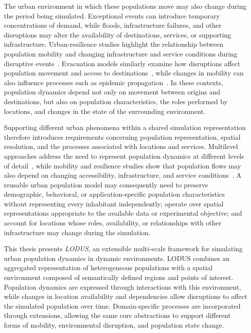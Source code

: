 The urban environment in which these populations move may also change during the period being simulated. Exceptional events can introduce temporary concentrations of demand, while floods, infrastructure failures, and other disruptions may alter the availability of destinations, services, or supporting infrastructure. 
Urban-resilience studies highlight the relationship between population mobility and changing infrastructure and service conditions during disruptive events~\cite{haraguchi2022mobilityDataReview,ye2023digitalTwinResiliance}. Evacuation models similarly examine how disruptions affect population movement and access to destinations~\cite{hassannayebi2020hybridEvacuation}, while changes in mobility can also influence processes such as epidemic propagation~\cite{natureKramer2020mobilityCovid,hernandez2021human}. In these contexts, population dynamics depend not only on movement between origins and destinations, but also on population characteristics, the roles performed by locations, and changes in the state of the surrounding environment.

Supporting different urban phenomena within a shared simulation representation therefore introduces requirements concerning population representation, spatial resolution, and the processes associated with locations and services. Multilevel approaches address the need to represent population dynamics at different levels of detail~\cite{serana2023multilevelmodeling}, while mobility and resilience studies show that population flows may also depend on changing accessibility, infrastructure, and service conditions~\cite{haraguchi2022mobilityDataReview,ye2023digitalTwinResiliance}. 
A reusable urban population model may consequently need to preserve demographic, behavioral, or application-specific population characteristics without representing every inhabitant independently; operate over spatial representations appropriate to the available data or experimental objective; and account for locations whose roles, availability, or relationships with other infrastructure may change during the simulation.

This thesis presents \textit{LODUS}, an extensible multi-scale framework for simulating urban population dynamics in dynamic environments. LODUS combines an aggregated representation of heterogeneous populations with a spatial environment composed of semantically defined regions and points of interest. Population dynamics are expressed through interactions with this environment, while changes in location availability and dependencies allow disruptions to affect the simulated population over time. Domain-specific processes are incorporated through extensions, allowing the same core abstractions to support different forms of mobility, environmental disruption, and population state change.

